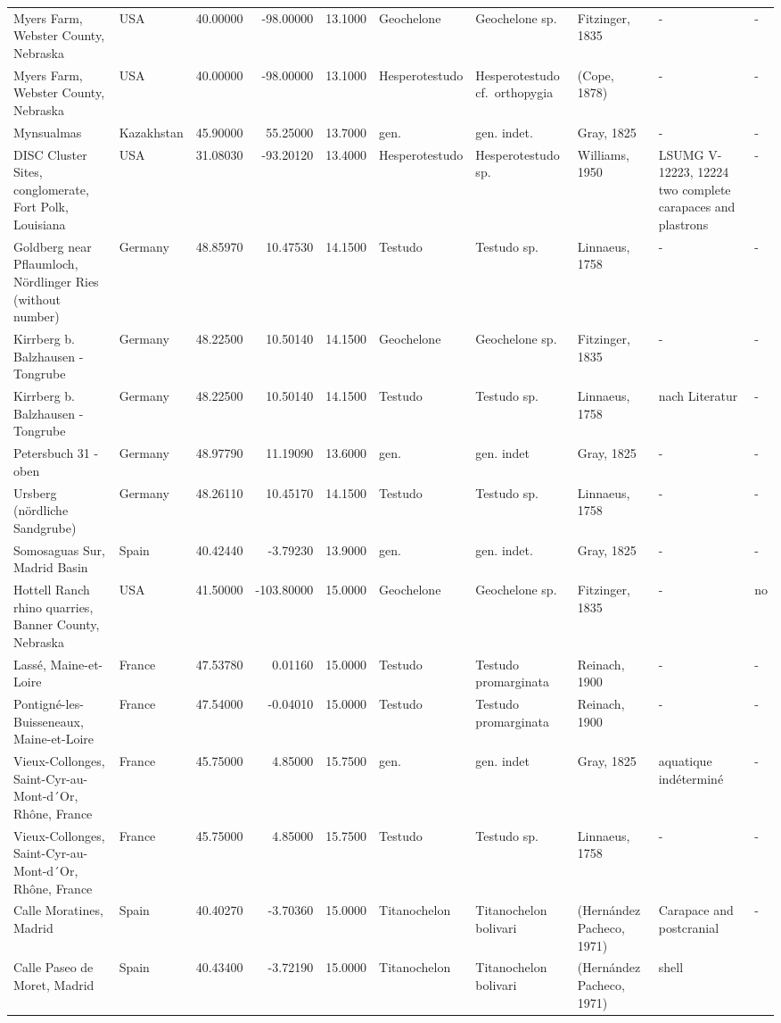 \documentclass[]{article}
\begin{document}
\begin{longtable}[]{@{}llrrrlllll@{}}
Myers Farm, Webster County, Nebraska & USA & 40.00000 & -98.00000 &
13.1000 & Geochelone & Geochelone sp. & Fitzinger, 1835 & - &
-\tabularnewline
Myers Farm, Webster County, Nebraska & USA & 40.00000 & -98.00000 &
13.1000 & Hesperotestudo & Hesperotestudo cf.~orthopygia & (Cope, 1878)
& - & -\tabularnewline
Mynsualmas & Kazakhstan & 45.90000 & 55.25000 & 13.7000 & gen. & gen.
indet. & Gray, 1825 & - & -\tabularnewline
DISC Cluster Sites, conglomerate, Fort Polk, Louisiana & USA & 31.08030
& -93.20120 & 13.4000 & Hesperotestudo & Hesperotestudo sp. & Williams,
1950 & LSUMG V-12223, 12224 two complete carapaces and plastrons &
-\tabularnewline
Goldberg near Pflaumloch, Nördlinger Ries (without number) & Germany &
48.85970 & 10.47530 & 14.1500 & Testudo & Testudo sp. & Linnaeus, 1758 &
- & -\tabularnewline
Kirrberg b. Balzhausen - Tongrube & Germany & 48.22500 & 10.50140 &
14.1500 & Geochelone & Geochelone sp. & Fitzinger, 1835 & - &
-\tabularnewline
Kirrberg b. Balzhausen - Tongrube & Germany & 48.22500 & 10.50140 &
14.1500 & Testudo & Testudo sp. & Linnaeus, 1758 & nach Literatur &
-\tabularnewline
Petersbuch 31 - oben & Germany & 48.97790 & 11.19090 & 13.6000 & gen. &
gen. indet & Gray, 1825 & - & -\tabularnewline
Ursberg (nördliche Sandgrube) & Germany & 48.26110 & 10.45170 & 14.1500
& Testudo & Testudo sp. & Linnaeus, 1758 & - & -\tabularnewline
Somosaguas Sur, Madrid Basin & Spain & 40.42440 & -3.79230 & 13.9000 &
gen. & gen. indet. & Gray, 1825 & - & -\tabularnewline
Hottell Ranch rhino quarries, Banner County, Nebraska & USA & 41.50000 &
-103.80000 & 15.0000 & Geochelone & Geochelone sp. & Fitzinger, 1835 & -
& no\tabularnewline
Lassé, Maine-et-Loire & France & 47.53780 & 0.01160 & 15.0000 & Testudo
& Testudo promarginata & Reinach, 1900 & - & -\tabularnewline
Pontigné-les-Buisseneaux, Maine-et-Loire & France & 47.54000 & -0.04010
& 15.0000 & Testudo & Testudo promarginata & Reinach, 1900 & - &
-\tabularnewline
Vieux-Collonges, Saint-Cyr-au-Mont-d´Or, Rhône, France & France &
45.75000 & 4.85000 & 15.7500 & gen. & gen. indet & Gray, 1825 &
aquatique indéterminé & -\tabularnewline
Vieux-Collonges, Saint-Cyr-au-Mont-d´Or, Rhône, France & France &
45.75000 & 4.85000 & 15.7500 & Testudo & Testudo sp. & Linnaeus, 1758 &
- & -\tabularnewline
Calle Moratines, Madrid & Spain & 40.40270 & -3.70360 & 15.0000 &
Titanochelon & Titanochelon bolivari & (Hernández Pacheco, 1971) &
Carapace and postcranial & -\tabularnewline
Calle Paseo de Moret, Madrid & Spain & 40.43400 & -3.72190 & 15.0000 &
Titanochelon & Titanochelon bolivari & (Hernández Pacheco, 1971) & shell

\end{longtable}
\end{document}
